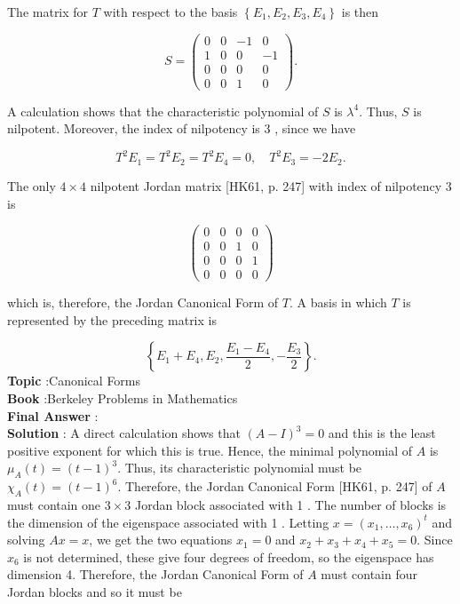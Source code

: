 \documentclass[10pt]{article}
\begin{document}
The matrix for $T$ with respect to the basis $\left\{E_{1}, E_{2}, E_{3}, E_{4}\right\}$ is then

$$
S=\left(\begin{array}{cccc}
0 & 0 & -1 & 0 \\
1 & 0 & 0 & -1 \\
0 & 0 & 0 & 0 \\
0 & 0 & 1 & 0
\end{array}\right) .
$$

A calculation shows that the characteristic polynomial of $S$ is $\lambda^{4}$. Thus, $S$ is nilpotent. Moreover, the index of nilpotency is 3 , since we have

$$
T^{2} E_{1}=T^{2} E_{2}=T^{2} E_{4}=0, \quad T^{2} E_{3}=-2 E_{2} .
$$

The only $4 \times 4$ nilpotent Jordan matrix [HK61, p. 247] with index of nilpotency 3 is

$$
\left(\begin{array}{llll}
0 & 0 & 0 & 0 \\
0 & 0 & 1 & 0 \\
0 & 0 & 0 & 1 \\
0 & 0 & 0 & 0
\end{array}\right)
$$

which is, therefore, the Jordan Canonical Form of $T$. A basis in which $T$ is represented by the preceding matrix is

$$
\left\{E_{1}+E_{4}, E_{2}, \frac{E_{1}-E_{4}}{2},-\frac{E_{3}}{2}\right\} .
$$
\textbf{Topic} :Canonical Forms \\
\textbf{Book} :Berkeley Problems in Mathematics\\
\textbf{Final Answer} :\\


\textbf{Solution} : A direct calculation shows that $(A-I)^{3}=0$ and this is the least positive exponent for which this is true. Hence, the minimal polynomial of $A$ is $\mu_{A}(t)=(t-1)^{3}$. Thus, its characteristic polynomial must be $\chi_{A}(t)=(t-1)^{6}$. Therefore, the Jordan Canonical Form [HK61, p. 247] of $A$ must contain one $3 \times 3$ Jordan block associated with 1 . The number of blocks is the dimension of the eigenspace associated with 1 . Letting $x=\left(x_{1}, \ldots, x_{6}\right)^{t}$ and solving $A x=x$, we get the two equations $x_{1}=0$ and $x_{2}+x_{3}+x_{4}+x_{5}=0$. Since $x_{6}$ is not determined, these give four degrees of freedom, so the eigenspace has dimension 4. Therefore, the Jordan Canonical Form of $A$ must contain four Jordan blocks and so it must be
\end{document}
